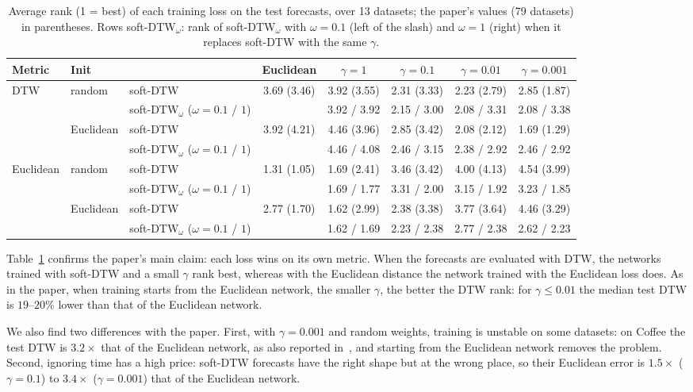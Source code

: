 \documentclass[11pt]{article}
\begin{document}
\begin{table}[h]
\centering\small
\caption{Average rank (1 = best) of each training loss on the test forecasts, over 13 datasets; the paper's values (79 datasets) in parentheses. Rows soft-DTW$_\omega$: rank of soft-DTW$_\omega$ with $\omega=0.1$ (left of the slash) and $\omega=1$ (right) when it replaces soft-DTW with the same $\gamma$.}
\label{tab:forecast}
\setlength{\tabcolsep}{2.6pt}
\begin{tabular}{lllccccc}
\toprule
Metric & Init & & Euclidean & $\gamma=1$ & $\gamma=0.1$ & $\gamma=0.01$ & $\gamma=0.001$ \\
\midrule
\multirow{4}{*}{DTW} & \multirow{2}{*}{random} & soft-DTW & 3.69 (3.46) & 3.92 (3.55) & 2.31 (3.33) & 2.23 (2.79) & 2.85 (1.87) \\
& & soft-DTW$_\omega$ ($\omega=0.1$ / $1$) & & 3.92 / 3.92 & 2.15 / 3.00 & 2.08 / 3.31 & 2.08 / 3.38 \\
& \multirow{2}{*}{Euclidean} & soft-DTW & 3.92 (4.21) & 4.46 (3.96) & 2.85 (3.42) & 2.08 (2.12) & 1.69 (1.29) \\
& & soft-DTW$_\omega$ ($\omega=0.1$ / $1$) & & 4.46 / 4.08 & 2.46 / 3.15 & 2.38 / 2.92 & 2.46 / 2.92 \\
\midrule
\multirow{4}{*}{Euclidean} & \multirow{2}{*}{random} & soft-DTW & 1.31 (1.05) & 1.69 (2.41) & 3.46 (3.42) & 4.00 (4.13) & 4.54 (3.99) \\
& & soft-DTW$_\omega$ ($\omega=0.1$ / $1$) & & 1.69 / 1.77 & 3.31 / 2.00 & 3.15 / 1.92 & 3.23 / 1.85 \\
& \multirow{2}{*}{Euclidean} & soft-DTW & 2.77 (1.70) & 1.62 (2.99) & 2.38 (3.38) & 3.77 (3.64) & 4.46 (3.29) \\
& & soft-DTW$_\omega$ ($\omega=0.1$ / $1$) & & 1.62 / 1.69 & 2.23 / 2.38 & 2.77 / 2.38 & 2.62 / 2.23 \\
\bottomrule
\end{tabular}
\end{table}

Table~\ref{tab:forecast} confirms the paper's main claim: each loss wins on its own metric. When the forecasts are evaluated with DTW, the networks trained with soft-DTW and a small $\gamma$ rank best, whereas with the Euclidean distance the network trained with the Euclidean loss does. As in the paper, when training starts from the Euclidean network, the smaller $\gamma$, the better the DTW rank: for $\gamma\le0.01$ the median test DTW is $19$--$20\%$ lower than that of the Euclidean network.

We also find two differences with the paper. First, with $\gamma=0.001$ and random weights, training is unstable on some datasets: on Coffee the test DTW is $3.2\times$ that of the Euclidean network, as also reported in~\cite{zeitler2023stabilizing}, and starting from the Euclidean network removes the problem. Second, ignoring time has a high price: soft-DTW forecasts have the right shape but at the wrong place, so their Euclidean error is $1.5\times$ ($\gamma=0.1$) to $3.4\times$ ($\gamma=0.001$) that of the Euclidean network.
\end{document}

